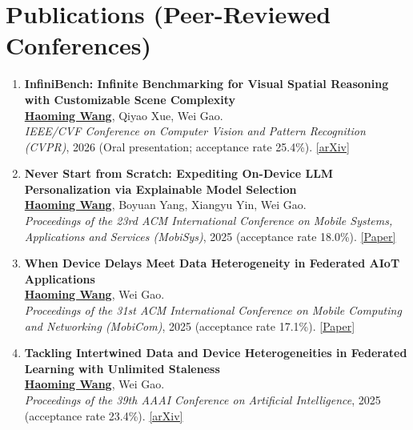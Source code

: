 \documentclass[11pt, letterpaper]{article}
\newenvironment{publist}{
  \begin{enumerate}[leftmargin=1.7em, itemsep=4pt, parsep=0pt, topsep=2pt,
                    label=\arabic*.]
}{\end{enumerate}}
\newcommand{\me}{\underline{\textbf{Haoming Wang}}}
\begin{document}
\section{Publications (Peer-Reviewed Conferences)}

\begin{publist}
\item \textbf{InfiniBench: Infinite Benchmarking for Visual Spatial Reasoning with Customizable Scene Complexity}\\
\me, Qiyao Xue, Wei Gao.\\
\textit{IEEE/CVF Conference on Computer Vision and Pattern Recognition (CVPR)}, 2026 (Oral presentation; acceptance rate 25.4\%). \href{https://arxiv.org/abs/2511.18200}{[arXiv]}

\item \textbf{Never Start from Scratch: Expediting On-Device LLM Personalization via Explainable Model Selection}\\
\me, Boyuan Yang, Xiangyu Yin, Wei Gao.\\
\textit{Proceedings of the 23rd ACM International Conference on Mobile Systems, Applications and Services (MobiSys)}, 2025 (acceptance rate 18.0\%). \href{https://haomingwang645.github.io/pdfs/xpert_paper.pdf}{[Paper]}

\item \textbf{When Device Delays Meet Data Heterogeneity in Federated AIoT Applications}\\
\me, Wei Gao.\\
\textit{Proceedings of the 31st ACM International Conference on Mobile Computing and Networking (MobiCom)}, 2025 (acceptance rate 17.1\%). \href{https://haomingwang645.github.io/pdfs/feddc_paper.pdf}{[Paper]}

\item \textbf{Tackling Intertwined Data and Device Heterogeneities in Federated Learning with Unlimited Staleness}\\
\me, Wei Gao.\\
\textit{Proceedings of the 39th AAAI Conference on Artificial Intelligence}, 2025 (acceptance rate 23.4\%). \href{https://arxiv.org/abs/2309.13536}{[arXiv]}
\end{publist}
\end{document}
